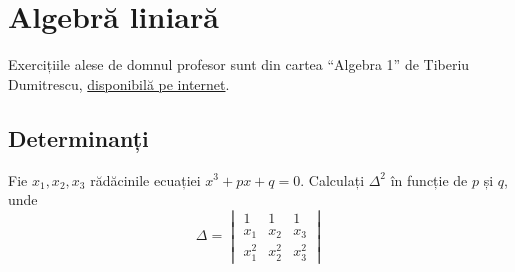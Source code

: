 \section{Algebră liniară}

Exercițiile alese de domnul profesor sunt din cartea ``Algebra 1'' de Tiberiu Dumitrescu, \href{http://www.gta.math.unibuc.ro/pages/Algebra1TD.pdf}{disponibilă pe internet}.

\subsection{Determinanți}

\begin{exercise}[176]
Fie \(x_1, x_2, x_3\) rădăcinile ecuației \(x^3 + px + q = 0\).
Calculați \(\Delta^2\) în funcție de \(p\) și \(q\), unde
\[
\Delta = \begin{vmatrix}
1 & 1 & 1 \\
x_1 & x_2 & x_3 \\
x_1^2 & x_2^2 & x_3^2
\end{vmatrix}
\]
\end{exercise}
